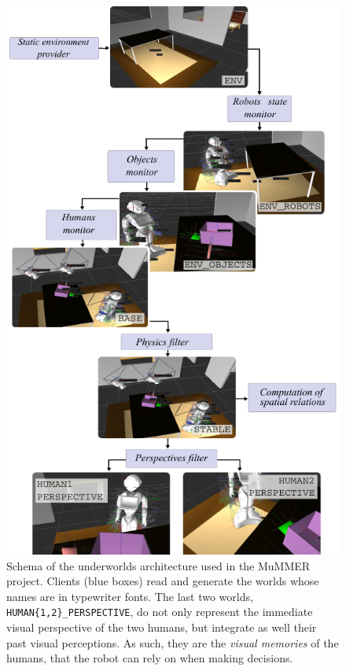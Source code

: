 \documentclass[letterpaper, 10pt, conference]{ieeeconf}
\newcommand{\uwds}{{\sc underworlds}\xspace}
\begin{document}
\begin{figure}
    \centering
    \includegraphics[width=\linewidth]{laasudws}
    \caption{Schema of the \uwds architecture used in the MuMMER project.
    Clients (blue boxes) read and generate the worlds whose names are in typewriter
    fonts. The last two worlds, {\tt HUMAN\{1,2\}\_PERSPECTIVE}, do not only
    represent the immediate visual perspective of the two humans, but integrate
    as well their past visual perceptions. As such, they are the \emph{visual
    memories} of the humans, that the robot can rely on when making decisions.}
    \label{fig|mummerarchitecture}
\end{figure}
\end{document}

